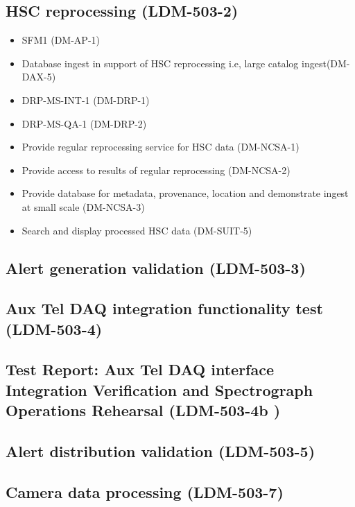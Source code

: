 \subsection{HSC reprocessing \textbf{(LDM-503-2)}\label{LDM-503-2}}

\begin{itemize}
\item SFM1 (DM-AP-1)
\item Database ingest in support of HSC reprocessing i.e, large catalog ingest(DM-DAX-5)
\item DRP-MS-INT-1 (DM-DRP-1)
\item DRP-MS-QA-1 (DM-DRP-2)
\item Provide regular reprocessing service for HSC data (DM-NCSA-1)
\item Provide access to results of regular reprocessing (DM-NCSA-2)
\item Provide database for metadata, provenance, location and demonstrate ingest at small scale (DM-NCSA-3)
\item Search and display processed HSC data (DM-SUIT-5)
\end{itemize}
\subsection{Alert generation validation \textbf{(LDM-503-3)}\label{LDM-503-3}}

\subsection{Aux Tel DAQ integration functionality test \textbf{(LDM-503-4)}\label{LDM-503-4}}

\subsection{Test Report: Aux Tel DAQ interface Integration Verification and Spectrograph Operations Rehearsal \textbf{(LDM-503-4b )}\label{LDM-503-4b }}

\subsection{Alert distribution validation \textbf{(LDM-503-5)}\label{LDM-503-5}}

\subsection{Camera data processing \textbf{(LDM-503-7)}\label{LDM-503-7}}

